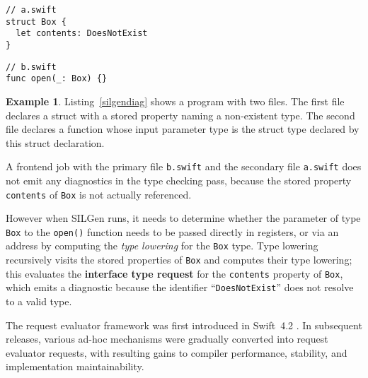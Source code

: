 \documentclass[a4paper,headsepline,bibliography=totoc,toc=flat,fleqn,twoside=semi]{scrbook}
\theoremstyle{definition}
\theoremstyle{definition}
\newtheorem{example}{Example}[chapter]
\theoremstyle{definition}
\begin{document}
\begin{listing}\label{silgendiag}
\begin{Verbatim}
// a.swift
struct Box {
  let contents: DoesNotExist
}
\end{Verbatim}
\begin{Verbatim}
// b.swift
func open(_: Box) {}
\end{Verbatim}
\end{listing}
\begin{example}
Listing~\ref{silgendiag} shows a program with two files. The first file declares a struct with a stored property naming a non-existent type. The second file declares a function whose input parameter type is the struct type declared by this struct declaration.

A frontend job with the primary file \texttt{b.swift} and the secondary file \texttt{a.swift} does not emit any diagnostics in the type checking pass, because the stored property \texttt{contents} of \texttt{Box} is not actually referenced.

However when SILGen runs, it needs to determine whether the parameter of type \texttt{Box} to the \texttt{open()} function needs to be passed directly in registers, or via an address by computing the \emph{type lowering} for the \texttt{Box} type. Type lowering recursively visits the stored properties of \texttt{Box} and computes their type lowering; this evaluates the \textbf{interface type request} for the \texttt{contents} property of \texttt{Box}, which emits a diagnostic because the identifier ``\texttt{DoesNotExist}'' does not resolve to a valid type.
\end{example}

The request evaluator framework was first introduced in Swift~4.2 \cite{reqeval}. In subsequent releases, various ad-hoc mechanisms were gradually converted into request evaluator requests, with resulting gains to compiler performance, stability, and implementation maintainability.

\end{document}
